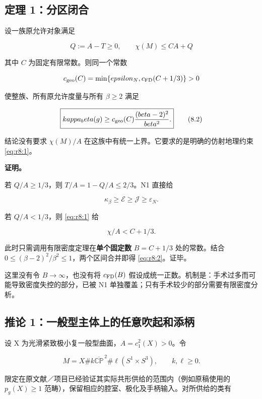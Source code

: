 \documentclass[UTF8,11pt,fontset=none]{ctexart}
\begin{document}
\subsection{定理 1：分区闭合}\label{ch8:ux5b9aux7406-1ux5206ux533aux95edux5408}

设一族原允许对象满足

\[
Q:=A-T\ge0,\qquad \chi(M)\le C A+Q
\tag{8.1}\label{eq:r8:1}
\]

其中 \(C\) 为固定有限常数。则同一个常数

\[
c_{\rm geo}(C)=\min\{\varepsilon_N,c_{\rm FD}(C+1/3)\}>0
\]

使整族、所有原允许度量与所有 \(\beta\ge2\) 满足

\[
\boxed{\kappa_\beta(g)\ge
c_{\rm geo}(C)\frac{(\beta-2)^2}{\beta^2}.}
\tag{8.2}\label{eq:r8:2}
\]

结论没有要求 \(\chi(M)/A\) 在这族中有统一上界。它要求的是明确的仿射地理约束 \eqref{eq:r8:1}。

\textbf{证明。}

若 \(Q/A\ge1/3\)，则 \(T/A=1-Q/A\le2/3\)。N1 直接给

\[
\kappa_\beta\ge\mathcal E\ge\mathcal J\ge\varepsilon_N.
\]

若 \(Q/A<1/3\)，则 \eqref{eq:r8:1} 给

\[
\chi/A<C+1/3.
\]

此时只需调用有限密度定理在\textbf{单个固定数} \(B=C+1/3\) 处的常数。结合 \(0\le(\beta-2)^2/\beta^2\le1\)，两个区间合并即得 \eqref{eq:r8:2}。证毕。

这里没有令 \(B\to\infty\)，也没有将 \(c_{\rm FD}(B)\) 假设成统一正数。机制是：手术过多而可能导致密度失控的部分，已被 N1 单独覆盖；只有手术较少的部分需要有限密度分析。

\subsection{推论 1：一般型主体上的任意吹起和添柄}\label{ch8:ux63a8ux8bba-1ux4e00ux822cux578bux4e3bux4f53ux4e0aux7684ux4efbux610fux5439ux8d77ux548cux6dfbux67c4}

\cite{LeBrunRicci,Noether}

设 X 为光滑紧致极小复一般型曲面，\(A=c_1^2(X)>0\)。令

\[
M=X\#k\overline{\mathbb{CP}}^{\,2}
\#\ell(S^1\times S^3),\qquad k,\ell\ge0.
\]

限定在原文献／项目已经验证其实际共形供给的范围内（例如原稿使用的 \(p_g(X)\ge1\) 范畴），保留相应的腔室、极化及手柄输入。对所供给的类有
\end{document}
